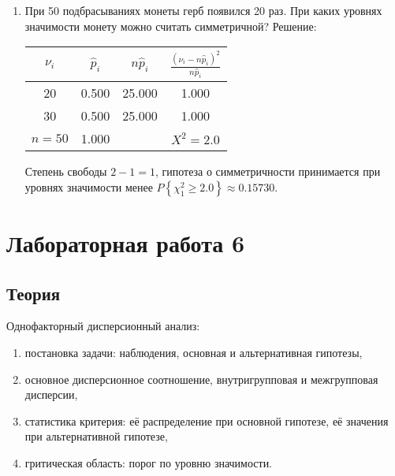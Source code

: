 \documentclass[a4paper,12pt]{article}
\newcommand{\probability}[1]{P \left\{ #1 \right\}}
\begin{document}
\begin{enumerate}
      \item \cite[281]{Efimov} При 50 подбрасываниях монеты герб появился 20 раз. При каких уровнях значимости монету можно считать симметричной?
            Решение: \par
            \begin{tabular}{|c|c|c|c|}
                  \hline
                  $\nu_i$  & $\widehat{p}_i$ & $n \widehat{p}_i$ & $\frac{(\nu_i - n \widehat{p}_i)^2}{n \widehat{p}_i}$ \\
                  \hline
                  20       & 0.500           & 25.000            & 1.000                                                 \\
                  30       & 0.500           & 25.000            & 1.000                                                 \\
                  \hline
                  $n = 50$ & 1.000           &                   & $X^2 = 2.0$                                           \\
                  \hline
            \end{tabular}

            Степень свободы $2 - 1 = 1$, гипотеза о симметричности принимается при уровнях значимости менее
            $\probability{\chi_1^2 \ge 2.0} \approx 0.15730$.

\end{enumerate}

\section*{Лабораторная работа 6}

\subsection*{Теория}

Однофакторный дисперсионный анализ:
\begin{enumerate}
      \item постановка задачи: наблюдения, основная и альтернативная гипотезы,
      \item основное дисперсионное соотношение, внутригрупповая и межгрупповая дисперсии,
      \item статистика критерия: её распределение при основной гипотезе, её значения при альтернативной гипотезе,
      \item гритическая область: порог по уровню значимости.
\end{enumerate}
\end{document}

